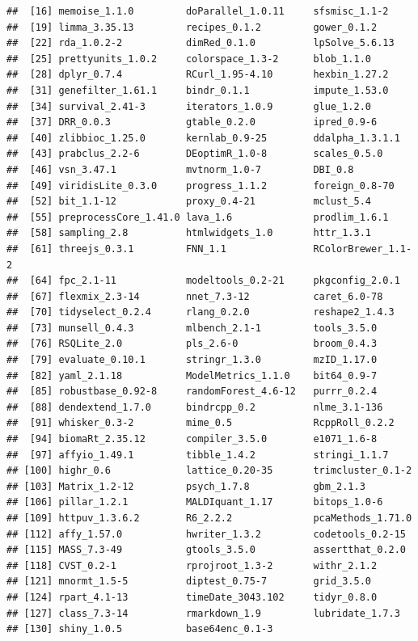\begin{knitrout}
\begin{kframe}
\begin{verbatim}
##  [16] memoise_1.1.0         doParallel_1.0.11     sfsmisc_1.1-2        
##  [19] limma_3.35.13         recipes_0.1.2         gower_0.1.2          
##  [22] rda_1.0.2-2           dimRed_0.1.0          lpSolve_5.6.13       
##  [25] prettyunits_1.0.2     colorspace_1.3-2      blob_1.1.0           
##  [28] dplyr_0.7.4           RCurl_1.95-4.10       hexbin_1.27.2        
##  [31] genefilter_1.61.1     bindr_0.1.1           impute_1.53.0        
##  [34] survival_2.41-3       iterators_1.0.9       glue_1.2.0           
##  [37] DRR_0.0.3             gtable_0.2.0          ipred_0.9-6          
##  [40] zlibbioc_1.25.0       kernlab_0.9-25        ddalpha_1.3.1.1      
##  [43] prabclus_2.2-6        DEoptimR_1.0-8        scales_0.5.0         
##  [46] vsn_3.47.1            mvtnorm_1.0-7         DBI_0.8              
##  [49] viridisLite_0.3.0     progress_1.1.2        foreign_0.8-70       
##  [52] bit_1.1-12            proxy_0.4-21          mclust_5.4           
##  [55] preprocessCore_1.41.0 lava_1.6              prodlim_1.6.1        
##  [58] sampling_2.8          htmlwidgets_1.0       httr_1.3.1           
##  [61] threejs_0.3.1         FNN_1.1               RColorBrewer_1.1-2   
##  [64] fpc_2.1-11            modeltools_0.2-21     pkgconfig_2.0.1      
##  [67] flexmix_2.3-14        nnet_7.3-12           caret_6.0-78         
##  [70] tidyselect_0.2.4      rlang_0.2.0           reshape2_1.4.3       
##  [73] munsell_0.4.3         mlbench_2.1-1         tools_3.5.0          
##  [76] RSQLite_2.0           pls_2.6-0             broom_0.4.3          
##  [79] evaluate_0.10.1       stringr_1.3.0         mzID_1.17.0          
##  [82] yaml_2.1.18           ModelMetrics_1.1.0    bit64_0.9-7          
##  [85] robustbase_0.92-8     randomForest_4.6-12   purrr_0.2.4          
##  [88] dendextend_1.7.0      bindrcpp_0.2          nlme_3.1-136         
##  [91] whisker_0.3-2         mime_0.5              RcppRoll_0.2.2       
##  [94] biomaRt_2.35.12       compiler_3.5.0        e1071_1.6-8          
##  [97] affyio_1.49.1         tibble_1.4.2          stringi_1.1.7        
## [100] highr_0.6             lattice_0.20-35       trimcluster_0.1-2    
## [103] Matrix_1.2-12         psych_1.7.8           gbm_2.1.3            
## [106] pillar_1.2.1          MALDIquant_1.17       bitops_1.0-6         
## [109] httpuv_1.3.6.2        R6_2.2.2              pcaMethods_1.71.0    
## [112] affy_1.57.0           hwriter_1.3.2         codetools_0.2-15     
## [115] MASS_7.3-49           gtools_3.5.0          assertthat_0.2.0     
## [118] CVST_0.2-1            rprojroot_1.3-2       withr_2.1.2          
## [121] mnormt_1.5-5          diptest_0.75-7        grid_3.5.0           
## [124] rpart_4.1-13          timeDate_3043.102     tidyr_0.8.0          
## [127] class_7.3-14          rmarkdown_1.9         lubridate_1.7.3      
## [130] shiny_1.0.5           base64enc_0.1-3
\end{verbatim}
\end{kframe}
\end{knitrout}

